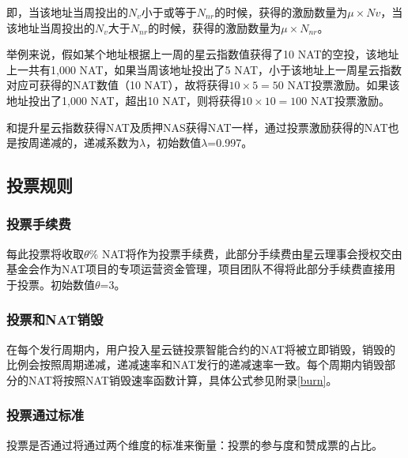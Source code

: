 即，当该地址当周投出的$N_{v}$小于或等于$N_{nr}$的时候，获得的激励数量为$\mu\times Nv$，当该地址当周投出的$N_{v}$大于$N_{nr}$的时候，获得的激励数量为$\mu\times N_{nr}$。

举例来说，假如某个地址根据上一周的星云指数值获得了10 NAT的空投，该地址上一共有1,000 NAT，如果当周该地址投出了5 NAT，小于该地址上一周星云指数对应可获得的NAT数值（10 NAT），故将获得$10\times5=50$ NAT投票激励。如果该地址投出了1,000 NAT，超出10 NAT，则将获得$10\times10=100$ NAT投票激励。

和提升星云指数获得NAT及质押NAS获得NAT一样，通过投票激励获得的NAT也是按周递减的，递减系数为$\lambda$，初始数值$\lambda$=0.997。

\subsection{投票规则}
	
\subsubsection{投票手续费}

每此投票将收取$\theta$\% NAT将作为投票手续费，此部分手续费由星云理事会授权交由基金会作为NAT项目的专项运营资金管理，项目团队不得将此部分手续费直接用于投票。初始数值$\theta$=3。

\subsubsection{投票和NAT销毁}

在每个发行周期内，用户投入星云链投票智能合约的NAT将被立即销毁，销毁的比例会按照周期递减，递减速率和NAT发行的递减速率一致。每个周期内销毁部分的NAT将按照NAT销毁速率函数计算，具体公式参见附录\ref{burn}。

\subsubsection{投票通过标准}
	
投票是否通过将通过两个维度的标准来衡量：投票的参与度和赞成票的占比。

